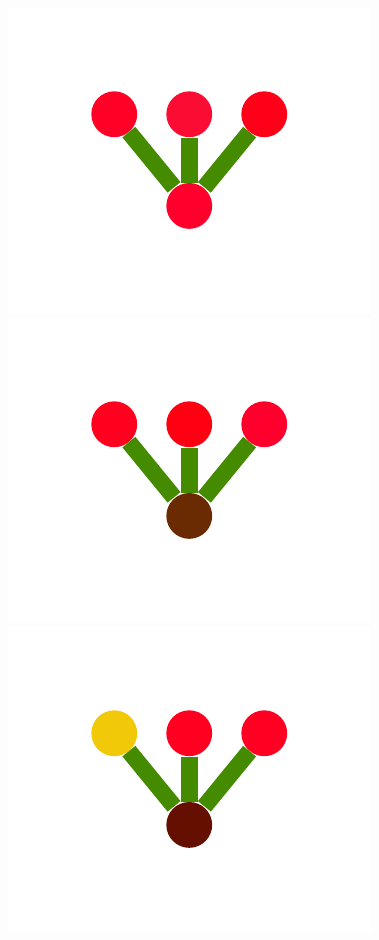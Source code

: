\documentclass[a4paper,10pt]{article}
\begin{document}
\begin{figure}
{    \includegraphics[scale=.26]{../figures/vector/4-2-1-noisyprog-postA-6.pdf}
    \includegraphics[scale=.26]{../figures/vector/4-2-1-noisyprog-postA-7.pdf}
    \includegraphics[scale=.26]{../figures/vector/4-2-1-noisyprog-postA-8.pdf}
    \label{fig:noisy-good}    
    }
\end{figure}
\end{document}
